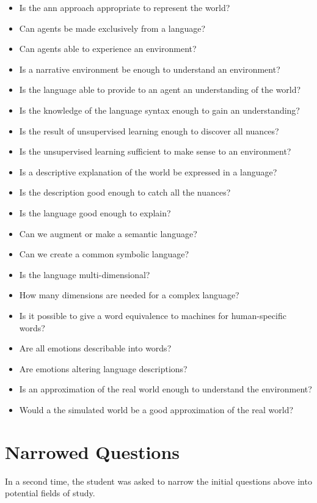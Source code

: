 \begin{itemize}[noitemsep]
    \item Is the \gls{ann} approach appropriate to represent the world?
    \item Can agents be made exclusively from a language?
    \item Can agents able to experience an environment?
    \item Is a narrative environment be enough to understand an environment?
    \item Is the language able to provide to an agent an understanding of the world?
    \item Is the knowledge of the language syntax enough to gain an understanding?
    \item Is the result of unsupervised learning enough to discover all nuances?
    \item Is the unsupervised learning sufficient to make sense to an environment?
    \item Is a descriptive explanation of the world be expressed in a language?
    \item Is the description good enough to catch all the nuances?
    \item Is the language good enough to explain?
    \item Can we augment or make a semantic language?
    \item Can we create a common symbolic language?
    \item Is the language multi-dimensional?
    \item How many dimensions are needed for a complex language?
    \item Is it possible to give a word equivalence to machines for human-specific words?
    \item Are all emotions describable into words?
    \item Are emotions altering language descriptions?
    \item Is an approximation of the real world enough to understand the environment?
    \item Would a the simulated world be a good approximation of the real world?
\end{itemize}

\section{Narrowed Questions}
In a second time, the student was asked to narrow the initial questions above into potential fields of study.

